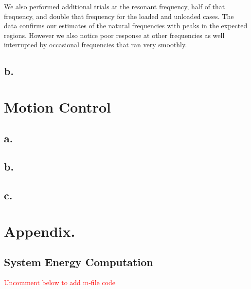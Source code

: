 \documentclass{article}
\newcommand{\xxx}[1]{\textcolor{red}{#1}}
\theoremstyle{plain}
\theoremstyle{definition}
\theoremstyle{remark}
\begin{document}
We also performed additional trials at the resonant frequency, half of that frequency, and double that frequency for the loaded and unloaded cases.  The data confirms our estimates of the natural frequencies with peaks in the expected regions.  However we also notice poor response at other frequencies as well interrupted by occasional frequencies that ran very smoothly. 

\subsection*{b.}

\clearpage

\section{Motion Control}
\subsection*{a.}
\subsection*{b.}
\subsection*{c.}

\clearpage




\clearpage
\section*{Appendix.}

\subsection*{System Energy Computation}
\xxx{Uncomment below to add m-file code}
%
\end{document}
